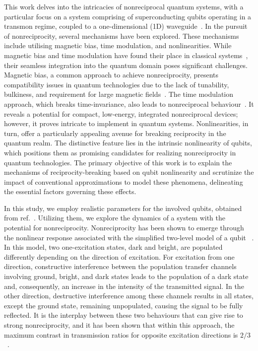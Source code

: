 \documentclass[lettersize,journal]{IEEEtran}
\begin{document}
This work delves into the intricacies of nonreciprocal quantum systems, with a particular focus on a system comprising of superconducting qubits operating in a transmon regime, coupled to a one-dimensional (1D) waveguide~\cite{dai_rectification_2015, muller_nonreciprocal_2017, rosario_hamann_nonreciprocity_2018, Nefedkin2022}. In the pursuit of nonreciprocity, several mechanisms have been explored. These mechanisms include utilising magnetic bias, time modulation, and nonlinearities. While magnetic bias and time modulation have found their place in classical systems~\cite{Pozar2011Microwave, Hogan1952Ferromagnetic, sounas_non-reciprocal_2017, wang2020nonreciprocity}, their seamless integration into the quantum domain poses significant challenges. Magnetic bias, a common approach to achieve nonreciprocity, presents compatibility issues in quantum technologies due to the lack of tunability, bulkiness, and requirement for large magnetic fields~\cite{bi2011chip,zhang2019monolithic,ren2021single}. The time modulation approach, which breaks time-invariance, also leads to nonreciprocal behaviour~\cite{sounas_non-reciprocal_2017, wang2020nonreciprocity}. It reveals a potential for compact, low-energy, integrated nonreciprocal devices; however, it proves intricate to implement in quantum systems. Nonlinearities, in turn, offer a particularly appealing avenue for breaking reciprocity in the quantum realm. The distinctive feature lies in the intrinsic nonlinearity of qubits, which positions them as promising candidates for realizing nonreciprocity in quantum technologies. 
The primary objective of this work is to explain the mechanisms of reciprocity-breaking based on qubit nonlinearity and scrutinize the impact of conventional approximations to model these phenomena, delineating the essential factors governing these effects.

In this study, we employ realistic parameters for the involved qubits, obtained from ref.~\cite{rosario_hamann_nonreciprocity_2018}. Utilizing them, we explore the dynamics of a system with the potential for nonreciprocity. Nonreciprocity has been shown to emerge through the nonlinear response associated with the simplified two-level model of a qubit ~\cite{lalumiere_input-output_2013, muller_nonreciprocal_2017}. In this model, two one-excitation states, dark and bright, are populated differently depending on the direction of excitation. For excitation from one direction, constructive interference between the population transfer channels involving ground, bright, and dark states leads to the population of a dark state and, consequently, an increase in the intensity of the transmitted signal. In the other direction, destructive interference among these channels results in all states, except the ground state, remaining unpopulated, causing the signal to be fully reflected. It is the interplay between these two behaviours that can give rise to strong nonreciprocity, and it has been shown that within this approach, the maximum contrast in transmission ratios for opposite excitation directions is $2/3$~\cite{muller_nonreciprocal_2017, Nefedkin2022}.
\end{document}
